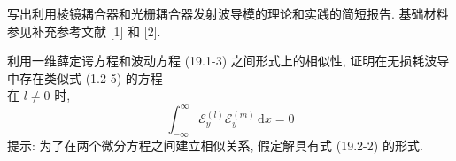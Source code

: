 \documentclass{note}
\begin{document}
\begin{exe}
    写出利用棱镜耦合器和光栅耦合器发射波导模的理论和实践的简短报告. 基础材料参见补充参考文献 [1] 和 [2].
\end{exe}
\begin{sol}
\end{sol}

\begin{exe}
    利用一维薛定谔方程和波动方程 (19.1-3) 之间形式上的相似性, 证明在无损耗波导中存在类似式 (1.2-5) 的方程\\
    在 $l\neq 0$ 时,
    \[
        \int_{-\infty}^{\infty}\mathcal{E}_y^{(l)}\mathcal{E}_y^{(m)}\,\mathrm{d}x=0
    \]
    提示: 为了在两个微分方程之间建立相似关系, 假定解具有式 (19.2-2) 的形式.
\end{exe}
\begin{pf}
    
\end{pf}
\ifx\allfiles\undefined
\end{document}
